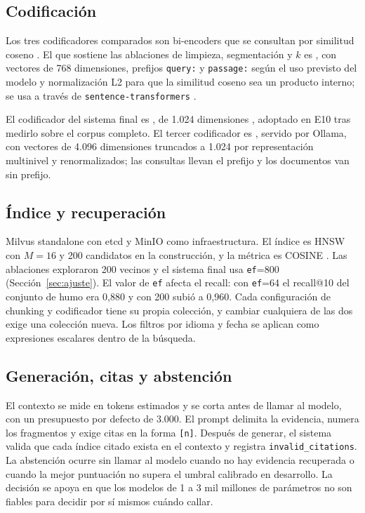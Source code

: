 \documentclass[11pt]{tg_usta}
\begin{document}
\subsection{Codificación}

\begin{sloppypar}
Los tres codificadores comparados son bi-encoders que se consultan por similitud coseno \cite{reimers2019sbert}. El que sostiene las ablaciones de limpieza, segmentación y $k$ es , con vectores de 768 dimensiones, prefijos \texttt{query:} y \texttt{passage:} según el uso previsto del modelo \cite{wang2024e5} y normalización L2 para que la similitud coseno sea un producto interno; se usa a través de \texttt{sentence-transformers} \cite{sbertdocs}.

El codificador del sistema final es , de 1.024 dimensiones \cite{chen2024bge}, adoptado en E10 tras medirlo sobre el corpus completo. El tercer codificador es , servido por Ollama, con vectores de 4.096 dimensiones truncados a 1.024 por representación multinivel y renormalizados; las consultas llevan el prefijo  y los documentos van sin prefijo.
\end{sloppypar}

\subsection{Índice y recuperación}

Milvus standalone con etcd y MinIO como infraestructura. El índice es HNSW con $M=16$ y 200 candidatos en la construcción, y la métrica es COSINE \cite{malkov2020hnsw,milvusdocs}. Las ablaciones exploraron 200 vecinos y el sistema final usa \texttt{ef}=800 (Sección~\ref{sec:ajuste}). El valor de \texttt{ef} afecta el recall: con \texttt{ef}=64 el recall@10 del conjunto de humo era 0,880 y con 200 subió a 0,960. Cada configuración de chunking y codificador tiene su propia colección, y cambiar cualquiera de las dos exige una colección nueva. Los filtros por idioma y fecha se aplican como expresiones escalares dentro de la búsqueda.

\subsection{Generación, citas y abstención}

El contexto se mide en tokens estimados y se corta antes de llamar al modelo, con un presupuesto por defecto de 3.000. El prompt delimita la evidencia, numera los fragmentos y exige citas en la forma \texttt{[n]}. Después de generar, el sistema valida que cada índice citado exista en el contexto y registra \texttt{invalid\_citations}. La abstención ocurre sin llamar al modelo cuando no hay evidencia recuperada o cuando la mejor puntuación no supera el umbral calibrado en desarrollo. La decisión se apoya en que los modelos de 1 a 3 mil millones de parámetros no son fiables para decidir por sí mismos cuándo callar.
\end{document}
